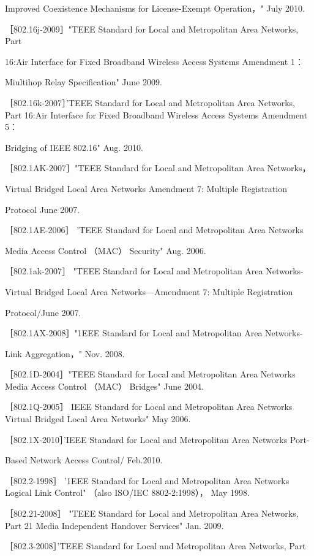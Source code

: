 Improved Coexistence Mechanisms for License-Exempt Operation，" July 2010.

［802.16j-2009］"TEEE Standard for Local and Metropolitan Area Networks, Part

16:Air Interface for Fixed Broadband Wireless Access Systems Amendment 1：

Miultihop Relay Specification" June 2009.

［802.16k-2007］'TEEE Standard for Local and Metropolitan Area Networks, Part
16:Air Interface for Fixed Broadband Wireless Access Systems Amendment 5：

Bridging of IEEE 802.16" Aug. 2010.

［802.1AK-2007］"TEEE Standard for Local and Metropolitan Area Networks，

Virtual Bridged Local Area Networks Amendment 7: Multiple Registration

Protocol June 2007.

［802.1AE-2006］ 'TEEE Standard for Local and Metropolitan Area Networks

Media Access Control （MAC） Security" Aug. 2006.

［802.1ak-2007］ "TEEE Standard for Local and Metropolitan Area Networks-

Virtual Bridged Local Area Networks—Amendment 7: Multiple Registration

Protocol/June 2007.

［802.1AX-2008］"1EEE Standard for Local and Metropolitan Area Networks-

Link Aggregation，" Nov. 2008.

［802.1D-2004］"TEEE Standard for Local and Metropolitan Area Networks Media
Access Control （MAC） Bridges" June 2004.

［802.1Q-2005］ IEEE Standard for Local and Metropolitan Area Networks Virtual
Bridged Local Area Networks" May 2006.

［802.1X-2010］'IEEE Standard for Local and Metropolitan Area Networks Port-

Based Network Access Control/ Feb.2010.

［802.2-1998］ '1EEE Standard for Local and Metropolitan Area Networks Logical
Link Control" （also ISO/IEC 8802-2:1998）， May 1998.

［802.21-2008］ "TEEE Standard for Local and Metropolitan Area Networks, Part 21
Media Independent Handover Services" Jan. 2009.

［802.3-2008］'TEEE Standard for Local and Metropolitan Area Networks, Part

